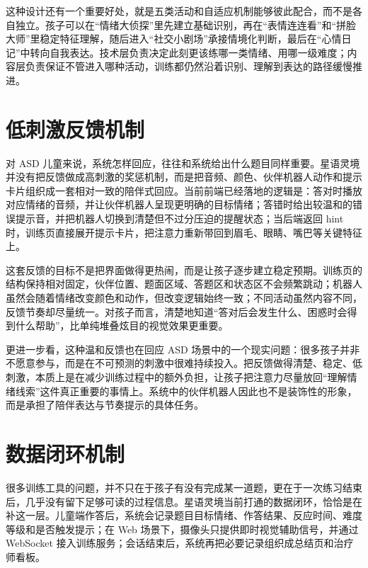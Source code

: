 这种设计还有一个重要好处，就是五类活动和自适应机制能够彼此配合，而不是各自独立。孩子可以在“情绪大侦探”里先建立基础识别，再在“表情连连看”和“拼脸大师”里稳定特征理解，随后进入“社交小剧场”承接情境化判断，最后在“心情日记”中转向自我表达。技术层负责决定此刻更该练哪一类情绪、用哪一级难度；内容层负责保证不管进入哪种活动，训练都仍然沿着识别、理解到表达的路径缓慢推进。

\clearpage

\section{低刺激反馈机制}
对 ASD 儿童来说，系统怎样回应，往往和系统给出什么题目同样重要。星语灵境并没有把反馈做成高刺激的奖惩机制，而是把音频、颜色、伙伴机器人动作和提示卡片组织成一套相对一致的陪伴式回应。当前前端已经落地的逻辑是：答对时播放对应情绪的音频，并让伙伴机器人呈现更明确的目标情绪；答错时给出较温和的错误提示音，并把机器人切换到清楚但不过分压迫的提醒状态；当后端返回 hint 时，训练页直接展开提示卡片，把注意力重新带回到眉毛、眼睛、嘴巴等关键特征上。


这套反馈的目标不是把界面做得更热闹，而是让孩子逐步建立稳定预期。训练页的结构保持相对固定，伙伴位置、题面区域、答题区和状态区不会频繁跳动；机器人虽然会随着情绪改变颜色和动作，但改变逻辑始终一致；不同活动虽然内容不同，反馈节奏却尽量统一。对孩子而言，清楚地知道“答对后会发生什么、困惑时会得到什么帮助”，比单纯堆叠炫目的视觉效果更重要。

更进一步看，这种温和反馈也在回应 ASD 场景中的一个现实问题：很多孩子并非不愿意参与，而是在不可预测的刺激中很难持续投入。把反馈做得清楚、稳定、低刺激，本质上是在减少训练过程中的额外负担，让孩子把注意力尽量放回“理解情绪线索”这件真正重要的事情上。系统中的伙伴机器人因此也不是装饰性的形象，而是承担了陪伴表达与节奏提示的具体任务。

\section{数据闭环机制}
很多训练工具的问题，并不只在于孩子有没有完成某一道题，更在于一次练习结束后，几乎没有留下足够可读的过程信息。星语灵境当前打通的数据闭环，恰恰是在补这一层。儿童端作答后，系统会记录题目目标情绪、作答结果、反应时间、难度等级和是否触发提示；在 Web 场景下，摄像头只提供即时视觉辅助信号，并通过 WebSocket 接入训练服务；会话结束后，系统再把必要记录组织成总结页和治疗师看板。


